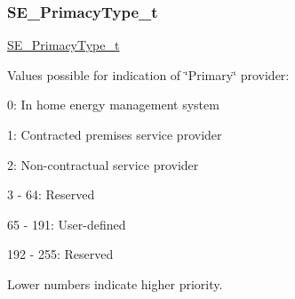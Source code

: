 \subsubsection{\texorpdfstring{S\+E\+\_\+\+Primacy\+Type\+\_\+t}{SE\_PrimacyType\_t}}
{\footnotesize\ttfamily \hyperlink{group__PrimacyType_ga484b22ef8ff92c8801e6a8b7bd8351eb}{S\+E\+\_\+\+Primacy\+Type\+\_\+t}}

Values possible for indication of \char`\"{}\+Primary\char`\"{} provider\+:

0\+: In home energy management system

1\+: Contracted premises service provider

2\+: Non-\/contractual service provider

3 -\/ 64\+: Reserved

65 -\/ 191\+: User-\/defined

192 -\/ 255\+: Reserved

Lower numbers indicate higher priority. 